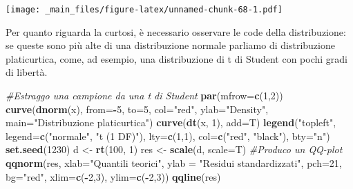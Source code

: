\documentclass[a4paper,12pt,oneside]{book}
\newenvironment{Shaded}{\begin{snugshade}}{\end{snugshade}}
\newcommand{\KeywordTok}[1]{\textcolor[rgb]{0.13,0.29,0.53}{\textbf{#1}}}
\newcommand{\DataTypeTok}[1]{\textcolor[rgb]{0.13,0.29,0.53}{#1}}
\newcommand{\DecValTok}[1]{\textcolor[rgb]{0.00,0.00,0.81}{#1}}
\newcommand{\StringTok}[1]{\textcolor[rgb]{0.31,0.60,0.02}{#1}}
\newcommand{\CommentTok}[1]{\textcolor[rgb]{0.56,0.35,0.01}{\textit{#1}}}
\newcommand{\OperatorTok}[1]{\textcolor[rgb]{0.81,0.36,0.00}{\textbf{#1}}}
\newcommand{\NormalTok}[1]{#1}
\theoremstyle{definition}
\theoremstyle{definition}
\theoremstyle{definition}
\theoremstyle{remark}
\begin{document}
\texttt{[image: \_main\_files/figure-latex/unnamed-chunk-68-1.pdf]}

Per quanto riguarda la curtosi, è necessario osservare le code della
distribuzione: se queste sono più alte di una distribuzione normale
parliamo di distribuzione platicurtica, come, ad esempio, una
distribuzione di t di Student con pochi gradi di libertà.

\begin{Shaded}
\begin{Highlighting}[]
\CommentTok{#Estraggo una campione da una t di Student}
\KeywordTok{par}\NormalTok{(}\DataTypeTok{mfrow=}\KeywordTok{c}\NormalTok{(}\DecValTok{1}\NormalTok{,}\DecValTok{2}\NormalTok{))}
\KeywordTok{curve}\NormalTok{(}\KeywordTok{dnorm}\NormalTok{(x), }\DataTypeTok{from=}\OperatorTok{-}\DecValTok{5}\NormalTok{, }\DataTypeTok{to=}\DecValTok{5}\NormalTok{, }\DataTypeTok{col=}\StringTok{"red"}\NormalTok{, }
      \DataTypeTok{ylab=}\StringTok{"Density"}\NormalTok{, }\DataTypeTok{main=}\StringTok{"Distribuzione platicurtica"}\NormalTok{)}
\KeywordTok{curve}\NormalTok{(}\KeywordTok{dt}\NormalTok{(x, }\DecValTok{1}\NormalTok{), }\DataTypeTok{add=}\NormalTok{T)}
\KeywordTok{legend}\NormalTok{(}\StringTok{"topleft"}\NormalTok{, }\DataTypeTok{legend=}\KeywordTok{c}\NormalTok{(}\StringTok{"normale"}\NormalTok{, }\StringTok{"t (1 DF)"}\NormalTok{),}
       \DataTypeTok{lty=}\KeywordTok{c}\NormalTok{(}\DecValTok{1}\NormalTok{,}\DecValTok{1}\NormalTok{), }\DataTypeTok{col=}\KeywordTok{c}\NormalTok{(}\StringTok{"red"}\NormalTok{, }\StringTok{"black"}\NormalTok{), }\DataTypeTok{bty=}\StringTok{"n"}\NormalTok{)}
\KeywordTok{set.seed}\NormalTok{(}\DecValTok{1230}\NormalTok{)}
\NormalTok{d <-}\StringTok{ }\KeywordTok{rt}\NormalTok{(}\DecValTok{100}\NormalTok{, }\DecValTok{1}\NormalTok{)}
\NormalTok{res <-}\StringTok{ }\KeywordTok{scale}\NormalTok{(d, }\DataTypeTok{scale=}\NormalTok{T)}
\CommentTok{#Produco un QQ-plot}
\KeywordTok{qqnorm}\NormalTok{(res, }\DataTypeTok{xlab=}\StringTok{"Quantili teorici"}\NormalTok{, }
     \DataTypeTok{ylab =} \StringTok{"Residui  standardizzati"}\NormalTok{,}
     \DataTypeTok{pch=}\DecValTok{21}\NormalTok{, }\DataTypeTok{bg=}\StringTok{"red"}\NormalTok{, }\DataTypeTok{xlim=}\KeywordTok{c}\NormalTok{(}\OperatorTok{-}\DecValTok{2}\NormalTok{,}\DecValTok{3}\NormalTok{), }\DataTypeTok{ylim=}\KeywordTok{c}\NormalTok{(}\OperatorTok{-}\DecValTok{2}\NormalTok{,}\DecValTok{3}\NormalTok{))}
\KeywordTok{qqline}\NormalTok{(res)}
\end{Highlighting}
\end{Shaded}
\end{document}
